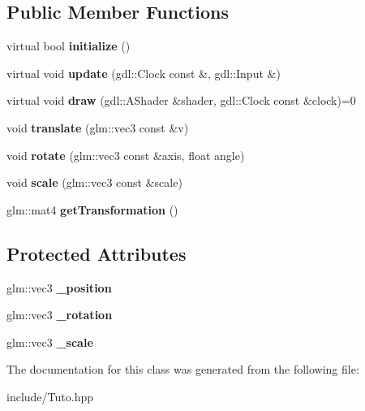 \subsection*{Public Member Functions}
\begin{DoxyCompactItemize}
\item 
\hypertarget{class_a_object_a5b56ca87e8f8a518ce275a817b4141fe}{}virtual bool {\bfseries initialize} ()\label{class_a_object_a5b56ca87e8f8a518ce275a817b4141fe}

\item 
\hypertarget{class_a_object_aa810b242ebb67515cc2e41b912eb2e2e}{}virtual void {\bfseries update} (gdl\+::\+Clock const \&, gdl\+::\+Input \&)\label{class_a_object_aa810b242ebb67515cc2e41b912eb2e2e}

\item 
\hypertarget{class_a_object_a1b89b2349e8d5d784f15370363129c97}{}virtual void {\bfseries draw} (gdl\+::\+A\+Shader \&shader, gdl\+::\+Clock const \&clock)=0\label{class_a_object_a1b89b2349e8d5d784f15370363129c97}

\item 
\hypertarget{class_a_object_a9ed44e3e944f121e2cb810bc4cb44dfe}{}void {\bfseries translate} (glm\+::vec3 const \&v)\label{class_a_object_a9ed44e3e944f121e2cb810bc4cb44dfe}

\item 
\hypertarget{class_a_object_afc6af2c9ad471614a242aed0eefb85a8}{}void {\bfseries rotate} (glm\+::vec3 const \&axis, float angle)\label{class_a_object_afc6af2c9ad471614a242aed0eefb85a8}

\item 
\hypertarget{class_a_object_a4a6bd3264127bbc473db09f4cdd08da6}{}void {\bfseries scale} (glm\+::vec3 const \&scale)\label{class_a_object_a4a6bd3264127bbc473db09f4cdd08da6}

\item 
\hypertarget{class_a_object_aa6eada923404daf7899436e68831a10c}{}glm\+::mat4 {\bfseries get\+Transformation} ()\label{class_a_object_aa6eada923404daf7899436e68831a10c}

\end{DoxyCompactItemize}
\subsection*{Protected Attributes}
\begin{DoxyCompactItemize}
\item 
\hypertarget{class_a_object_a9cf7424b98012c3fe2dd5a4728b66ce7}{}glm\+::vec3 {\bfseries \+\_\+position}\label{class_a_object_a9cf7424b98012c3fe2dd5a4728b66ce7}

\item 
\hypertarget{class_a_object_ac8fe4b94643b78b956eba8b697e9f221}{}glm\+::vec3 {\bfseries \+\_\+rotation}\label{class_a_object_ac8fe4b94643b78b956eba8b697e9f221}

\item 
\hypertarget{class_a_object_a11596ba2bb7008228bdbae32f8492f76}{}glm\+::vec3 {\bfseries \+\_\+scale}\label{class_a_object_a11596ba2bb7008228bdbae32f8492f76}

\end{DoxyCompactItemize}


The documentation for this class was generated from the following file\+:\begin{DoxyCompactItemize}
\item 
include/Tuto.\+hpp\end{DoxyCompactItemize}
